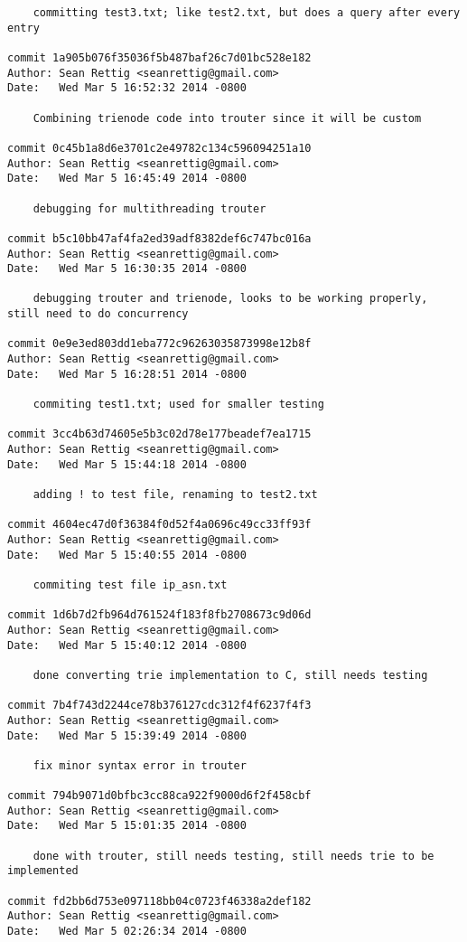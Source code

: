 \documentclass[letterpaper,10pt,fleqn]{article}
\numberwithin{equation}{section}
\begin{document}
\begin{verbatim}
    committing test3.txt; like test2.txt, but does a query after every entry

commit 1a905b076f35036f5b487baf26c7d01bc528e182
Author: Sean Rettig <seanrettig@gmail.com>
Date:   Wed Mar 5 16:52:32 2014 -0800

    Combining trienode code into trouter since it will be custom

commit 0c45b1a8d6e3701c2e49782c134c596094251a10
Author: Sean Rettig <seanrettig@gmail.com>
Date:   Wed Mar 5 16:45:49 2014 -0800

    debugging for multithreading trouter

commit b5c10bb47af4fa2ed39adf8382def6c747bc016a
Author: Sean Rettig <seanrettig@gmail.com>
Date:   Wed Mar 5 16:30:35 2014 -0800

    debugging trouter and trienode, looks to be working properly, still need to do concurrency

commit 0e9e3ed803dd1eba772c96263035873998e12b8f
Author: Sean Rettig <seanrettig@gmail.com>
Date:   Wed Mar 5 16:28:51 2014 -0800

    commiting test1.txt; used for smaller testing

commit 3cc4b63d74605e5b3c02d78e177beadef7ea1715
Author: Sean Rettig <seanrettig@gmail.com>
Date:   Wed Mar 5 15:44:18 2014 -0800

    adding ! to test file, renaming to test2.txt

commit 4604ec47d0f36384f0d52f4a0696c49cc33ff93f
Author: Sean Rettig <seanrettig@gmail.com>
Date:   Wed Mar 5 15:40:55 2014 -0800

    commiting test file ip_asn.txt

commit 1d6b7d2fb964d761524f183f8fb2708673c9d06d
Author: Sean Rettig <seanrettig@gmail.com>
Date:   Wed Mar 5 15:40:12 2014 -0800

    done converting trie implementation to C, still needs testing

commit 7b4f743d2244ce78b376127cdc312f4f6237f4f3
Author: Sean Rettig <seanrettig@gmail.com>
Date:   Wed Mar 5 15:39:49 2014 -0800

    fix minor syntax error in trouter

commit 794b9071d0bfbc3cc88ca922f9000d6f2f458cbf
Author: Sean Rettig <seanrettig@gmail.com>
Date:   Wed Mar 5 15:01:35 2014 -0800

    done with trouter, still needs testing, still needs trie to be implemented

commit fd2bb6d753e097118bb04c0723f46338a2def182
Author: Sean Rettig <seanrettig@gmail.com>
Date:   Wed Mar 5 02:26:34 2014 -0800


\end{verbatim}
\end{document}
